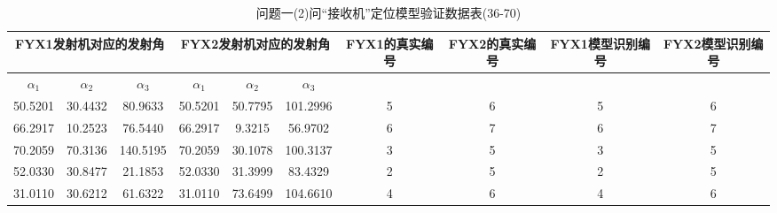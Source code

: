 \documentclass[withoutpreface,bwprint]{cumcmthesis}
\begin{document}
\begin{appendices}
		
		\begin{table}[htbp!]
			\footnotesize
			\caption{问题一(2)问“接收机”定位模型验证数据表(36-70)}
			\centering
			\tabcolsep=0.1cm
			\begin{tabular}{@{}cccccccccc@{}}
				\toprule
				\multicolumn{3}{c}{\textbf{FYX1发射机对应的发射角}}                                                           & \multicolumn{3}{c}{\textbf{FYX2发射机对应的发射角}}                                                           & \textbf{FYX1的真实编号} & \textbf{FYX2的真实编号} & \textbf{FYX1模型识别编号} & \textbf{FYX2模型识别编号} \\ \midrule
				\multicolumn{1}{c|}{\textbf{$\alpha_{1}$}} & \multicolumn{1}{c|}{\textbf{$\alpha_{2}$}} & \multicolumn{1}{c|}{\textbf{$\alpha_{3}$}} & \multicolumn{1}{c|}{\textbf{$\alpha_{1}$}} & \multicolumn{1}{c|}{\textbf{$\alpha_{2}$}} & \multicolumn{1}{c|}{\textbf{$\alpha_{3}$}} & \multicolumn{4}{c}{\textbf{}}  
				\\ \midrule
				50.5201                          & 30.4432                          & 80.9633                          & 50.5201                          & 50.7795                          & 101.2996                         & 5                    & 6                    & 5                      & 6                      \\
				66.2917                          & 10.2523                          & 76.5440                          & 66.2917                          & 9.3215                           & 56.9702                          & 6                    & 7                    & 6                      & 7                      \\
				70.2059                          & 70.3136                          & 140.5195                         & 70.2059                          & 30.1078                          & 100.3137                         & 3                    & 5                    & 3                      & 5                      \\
				52.0330                          & 30.8477                          & 21.1853                          & 52.0330                          & 31.3999                          & 83.4329                          & 2                    & 5                    & 2                      & 5                      \\
				31.0110                          & 30.6212                          & 61.6322                          & 31.0110                          & 73.6499                          & 104.6610                         & 4                    & 6                    & 4                      & 6                      \\

\end{tabular}
\end{table}
\end{appendices}
\end{document}
